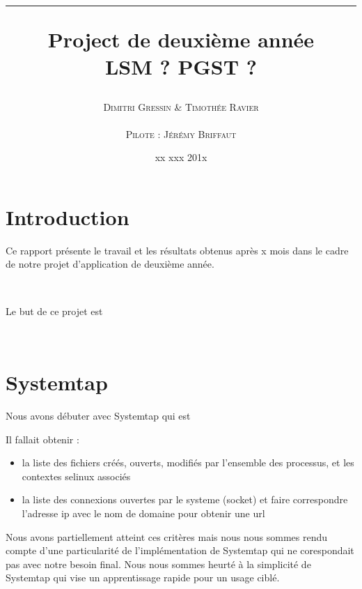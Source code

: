 \documentclass[pdftex,a4paper,titlepage,11pt,openright]{article}
\newcommand{\nom}[1]{\textsc{#1}}
\newcommand{\ligne}[1][1pt]{
  \par\noindent
  \rule[.5ex]{\linewidth}{#1}\par}
\newcommand{\clearemptydoublepage}{
	\newpage{\pagestyle{empty}\cleardoublepage}}
\begin{document}
\setlength{\parskip}{2.4ex}

\title{\ligne{\Large}\textbf{Project de deuxième année}\\
\Large LSM ? PGST ?} %
\author{\nom{Dimitri Gressin} \& \nom{Timothée Ravier}\\\\\nom{Pilote : Jérémy Briffaut}}
\date{xx xxx 201x} %


\maketitle

\clearemptydoublepage

\setcounter{secnumdepth}{2}
\setcounter{tocdepth}{2}
\tableofcontents
\addtocounter{page}{-1}

\newpage

\section*{Introduction} 
Ce rapport présente le travail et les résultats obtenus après x mois dans le cadre de notre projet d'application de deuxième année. %

~

Le but de ce projet est %

~


\newpage

\section{Systemtap}
Nous avons débuter avec Systemtap qui est %

Il fallait obtenir :
\begin{itemize}
	\item la liste des fichiers créés, ouverts, modifiés par l'ensemble des processus, et les contextes selinux associés
	\item la liste des connexions ouvertes par le systeme (socket) et faire correspondre l'adresse ip avec le nom de domaine pour obtenir une url
\end{itemize}

Nous avons partiellement atteint ces critères mais nous nous sommes rendu compte d'une particularité de l'implémentation de Systemtap qui ne corespondait pas avec notre besoin final. Nous nous sommes heurté à la simplicité de Systemtap qui vise un apprentissage rapide pour un usage ciblé.
\end{document}
